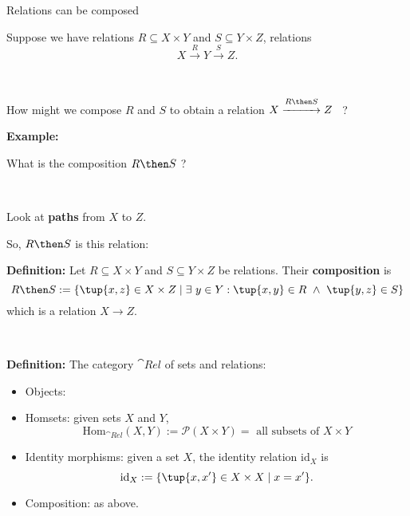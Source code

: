 \begin{frame}[fragile]{Relations can be composed}

Suppose we have relations $R \subseteq X \times Y$ and $S \subseteq Y \times Z$,  relations
$$
X \overset{R}{\longrightarrow} Y \overset{S}{\longrightarrow} Z.
$$

\

How might we compose $R$ and $S$ to obtain a relation $X \overset{R \then S}{\xrightarrow{\hspace*{1cm}}} Z$ \ ?

\vfill \vfill \vfill \vfill \vfill \vfill \vfill \vfill 

\end{frame}



\begin{frame}[fragile]

\textbf{Example:} 


\vfill \vfill \vfill \vfill \vfill \vfill 

What is the composition $R \then S$ ? 

\

Look at \textbf{paths} from $X$ to $Z$. 
\end{frame}




\begin{frame}[fragile]

\vfill \vfill \vfill \vfill \vfill \vfill 

So, $R \then S$ is this relation:

\vfill \vfill \vfill \vfill \vfill \vfill 

\end{frame}





\begin{frame}[fragile]

\textbf{Definition:}  Let $R \subseteq X \times Y$ and $S \subseteq Y \times Z$ be relations. Their \textbf{composition} is
$$
R \then S := \{ \tup{x,z} \in X \times Z \mid \exists \ y \in Y : \tup{x,y} \in R \ \wedge \  \tup{y,z} \in S \}
$$
which is a relation $X \rightarrow Z$. 

\

\textbf{Definition:} The category $\cat{Rel}$ of sets and relations:
\begin{itemize}
\item Objects: 
\item Homsets: given sets $X$ and $Y$, 
$$
\mathrm{Hom}_{\cat{Rel}}(X,Y) := \mathcal{P}(X \times Y) = \text{ all subsets of $X \times Y$}
$$
\item Identity morphisms: given a set $X$, the identity relation $\text{id}_{X}$ is
$$
\text{id}_X := \{ \tup{x,x'} \in X \times X \mid x = x' \}.
$$
\item Composition: as above. 
\end{itemize}

\end{frame}






